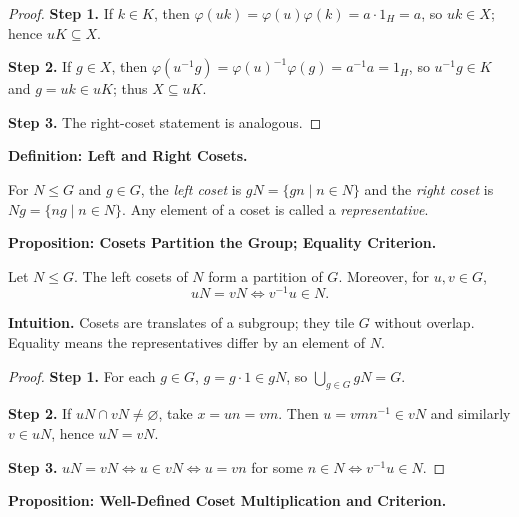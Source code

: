 \documentclass[9pt]{article}
\theoremstyle{definition}
\begin{document}
\dotfill

\begin{proof}
\textbf{Step 1.} If $k\in K$, then $\varphi(uk)=\varphi(u)\varphi(k)=a\cdot1_H=a$, so $uk\in X$; hence $uK\subseteq X$.

\textbf{Step 2.} If $g\in X$, then $\varphi(u^{-1}g)=\varphi(u)^{-1}\varphi(g)=a^{-1}a=1_H$, so $u^{-1}g\in K$ and $g=uk\in uK$; thus $X\subseteq uK$.

\textbf{Step 3.} The right-coset statement is analogous.
\end{proof}

\newpage

\noindent\textbf{Definition: Left and Right Cosets.}

\newpage

For $N\le G$ and $g\in G$, the \emph{left coset} is $gN=\{gn\mid n\in N\}$ and the \emph{right coset} is $Ng=\{ng\mid n\in N\}$. Any element of a coset is called a \emph{representative}.

\newpage

\noindent\textbf{Proposition: Cosets Partition the Group; Equality Criterion.}

\newpage

Let $N\le G$. The left cosets of $N$ form a partition of $G$. Moreover, for $u,v\in G$,
\[
uN=vN \iff v^{-1}u\in N.
\]

\dotfill

\noindent\textbf{Intuition.}
Cosets are translates of a subgroup; they tile $G$ without overlap. Equality means the representatives differ by an element of $N$.

\dotfill

\begin{proof}
\textbf{Step 1.} For each $g\in G$, $g=g\cdot1\in gN$, so $\bigcup_{g\in G}gN=G$.

\textbf{Step 2.} If $uN\cap vN\neq\varnothing$, take $x=un=vm$. Then $u=vmn^{-1}\in vN$ and similarly $v\in uN$, hence $uN=vN$.

\textbf{Step 3.} $uN=vN \iff u\in vN \iff u=vn$ for some $n\in N \iff v^{-1}u\in N$.
\end{proof}

\newpage

\noindent\textbf{Proposition: Well-Defined Coset Multiplication and Criterion.}

\newpage
\end{document}
